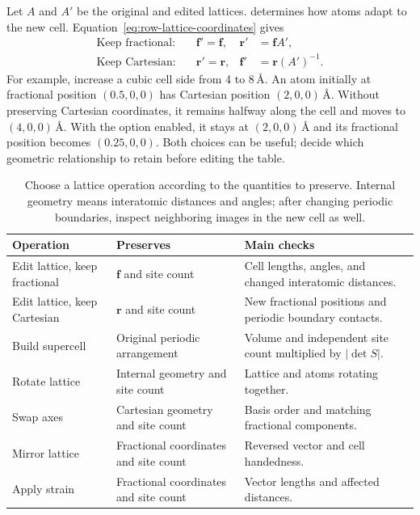 Let $A$ and $A'$ be the original and edited lattices.  determines how atoms adapt to the new cell. Equation~\eqref{eq:row-lattice-coordinates} gives
\begin{equation}
 \begin{aligned}
 \text{Keep fractional:}\quad&\mathbf f'=\mathbf f,
       &\mathbf r'&=\mathbf f A',\\
 \text{Keep Cartesian:}\quad&\mathbf r'=\mathbf r,
       &\mathbf f'&=\mathbf r(A')^{-1}.
 \end{aligned}
 \label{eq:lattice-preservation-options}
\end{equation}
For example, increase a cubic cell side from 4 to 8\,\AA. An atom initially at fractional position $(0.5,0,0)$ has Cartesian position $(2,0,0)\,\text{\AA}$. Without preserving Cartesian coordinates, it remains halfway along the cell and moves to $(4,0,0)\,\text{\AA}$. With the option enabled, it stays at $(2,0,0)\,\text{\AA}$ and its fractional position becomes $(0.25,0,0)$. Both choices can be useful; decide which geometric relationship to retain before editing the table.

\begin{table}[!htb]
\centering\small
\begin{tabularx}{\linewidth}{p{30mm}XX}
\toprule
Operation & Preserves & Main checks\\
\midrule
Edit lattice, keep fractional & $\mathbf f$ and site count & Cell lengths, angles, and changed interatomic distances.\\
Edit lattice, keep Cartesian & $\mathbf r$ and site count & New fractional positions and periodic boundary contacts.\\
Build supercell & Original periodic arrangement & Volume and independent site count multiplied by $|\det S|$.\\
Rotate lattice & Internal geometry and site count & Lattice and atoms rotating together.\\
Swap axes & Cartesian geometry and site count & Basis order and matching fractional components.\\
Mirror lattice & Fractional coordinates and site count & Reversed vector and cell handedness.\\
Apply strain & Fractional coordinates and site count & Vector lengths and affected distances.\\
\bottomrule
\end{tabularx}
\caption{Choose a lattice operation according to the quantities to preserve. Internal geometry means interatomic distances and angles; after changing periodic boundaries, inspect neighboring images in the new cell as well.}
\label{tab:round10-lattice-invariants}
\end{table}
